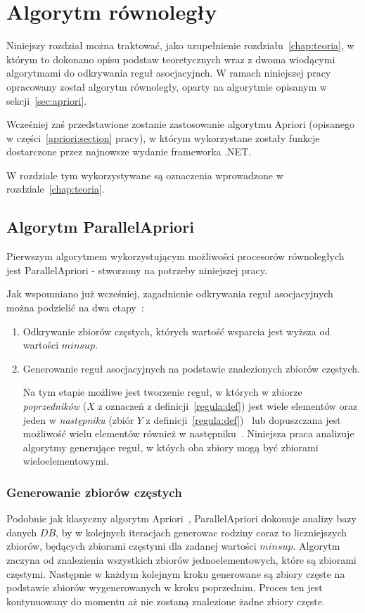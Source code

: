 \chapter{Algorytm równoległy\label{chap:alg_rownolegly}}

Niniejszy rozdział można traktować, jako uzupełnienie rozdziału~\ref{chap:teoria}, w którym to dokonano opisu podstaw teoretycznych wraz z dwoma wiodącymi algorytmami do odkrywania reguł asocjacyjnch. W ramach niniejszej pracy opracowany został algorytm równoległy, oparty na algorytmie opisanym w sekcji~\ref{sec:apriori}.

Wcześniej zaś przedstawione zostanie zastosowanie algorytmu Apriori (opisanego w części~\ref{apriori:section} pracy), w którym wykorzystane zostały funkcje dostarczone przez najnowsze wydanie frameworka .NET. 

W rozdziale tym wykorzystywane są oznaczenia wprowadzone w rozdziale~\ref{chap:teoria}.

\section{Algorytm ParallelApriori\label{sec:papriori}}
Pierwszym algorytmem wykorzystującym możliwości procesorów równoległych jest ParallelApriori - stworzony na potrzeby niniejszej pracy. 

Jak wspomniano już wcześniej, zagadnienie odkrywania reguł asocjacyjnych można podzielić na dwa etapy~\cite{Problem:Statement}:
\begin{enumerate}
	\item Odkrywanie zbiorów częstych, których wartość wsparcia jest wyższa od wartości $minsup$.
	\item Generowanie reguł asocjacyjnych na podstawie znalezionych zbiorów częstych.

	Na tym etapie możliwe jest tworzenie reguł, w których w zbiorze \emph{poprzedników} ($X$ z oznaczeń z definicji~\ref{regula:def}) jest wiele elementów oraz jeden w \emph{następniku} (zbiór $Y$ z definicji~\ref{regula:def})~\cite{Problem:Statement} lub dopuszczana jest możliwość wielu elementów również w następniku~\cite{Apriori:Main}. Niniejsza praca analizuje algorytmy generujące reguł, w któych oba zbiory mogą być zbiorami wieloelementowymi.
\end{enumerate}

\subsection{Generowanie zbiorów częstych}\label{papriori:gen}
Podobnie jak klasyczny algorytm Apriori~\cite{Apriori:Main}, ParallelApriori dokonuje analizy bazy danych $DB$, by w kolejnych iteracjach generowac rodziny coraz to liczniejszych zbiorów, będących zbiorami częstymi dla zadanej wartości $minsup$. Algorytm zaczyna od znalezienia wszystkich zbiorów jednoelementowych, które są zbiorami częstymi. Następnie w każdym kolejnym kroku generowane są zbiory częste na podstawie zbiorów wygenerowanych w kroku poprzednim. Proces ten jest kontynuowany do momentu aż nie zostaną znalezione żadne zbiory częste.

